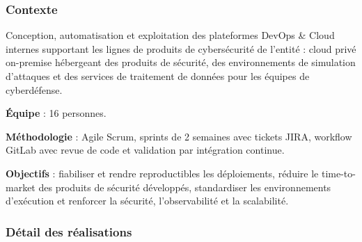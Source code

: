\documentclass[11pt,a4paper]{article}
\begin{document}
\subsubsection{Contexte}

Conception, automatisation et exploitation des plateformes DevOps \& Cloud internes supportant les lignes de produits de cybersécurité de l'entité : cloud privé on-premise hébergeant des produits de sécurité, des environnements de simulation d'attaques et des services de traitement de données pour les équipes de cyberdéfense.

\textbf{Équipe} : 16 personnes.

\textbf{Méthodologie} : Agile Scrum, sprints de 2 semaines avec tickets JIRA, workflow GitLab avec revue de code et validation par intégration continue.

\textbf{Objectifs} : fiabiliser et rendre reproductibles les déploiements, réduire le time-to-market des produits de sécurité développés, standardiser les environnements d'exécution et renforcer la sécurité, l'observabilité et la scalabilité.

\subsubsection{Détail des réalisations}
\end{document}
